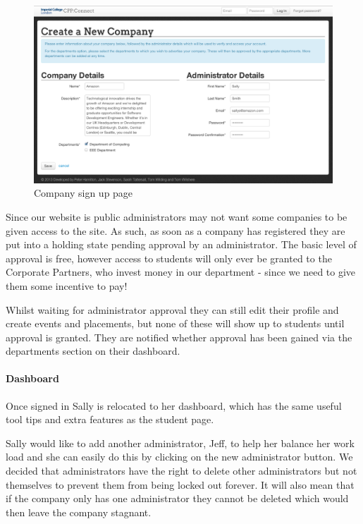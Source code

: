     \begin{figure}[H]\centering
    \includegraphics[scale=0.3]{images/user_experiences/company/amazon_signup}
    \caption{Company sign up page}
    \end{figure}

    Since our website is public administrators may not want some companies to be given access to the site. As such, as soon as a company has registered they are put into a holding state pending approval by an administrator.
    The basic level of approval is free, however access to students will only ever be granted to the Corporate Partners, who invest money in our department - since we need to give them some incentive to pay!

    Whilst waiting for administrator approval they can still edit their profile and create events and placements, but none of these will show up to students until approval is granted. They are notified whether approval has been gained via the departments section on their dashboard.

  \paragraph{Dashboard}
    Once signed in Sally is relocated to her dashboard, which has the same useful tool tips and extra features as the student page.

    Sally would like to add another administrator, Jeff, to help her balance her work load and she can easily do this by clicking on the new administrator button. We decided that administrators have the right to delete other administrators but not themselves to prevent them from being locked out forever. It will also mean that if the company only has one administrator they cannot be deleted which would then leave the company stagnant.


